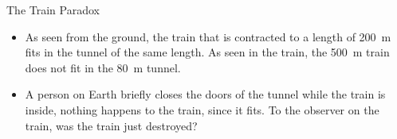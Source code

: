 \documentclass[aspectratio=169,
hyperref={colorlinks,urlcolor=blue}
]{beamer}
\begin{document}
\begin{frame}{The Train Paradox}
\vspace{-1cm}
\begin{itemize}
\item As seen from the ground, the train that is contracted to a length of \SI{200}{m} fits in the tunnel of the same length. As seen in the train, the \SI{500}{m} train does not fit in the \SI{80}{m} tunnel. 
\item A person on Earth briefly closes the doors of the tunnel while the train is inside, nothing happens to the train, since it fits. To the observer on the train, was the train just destroyed?
\end{itemize}
\end{frame}














\end{document}
